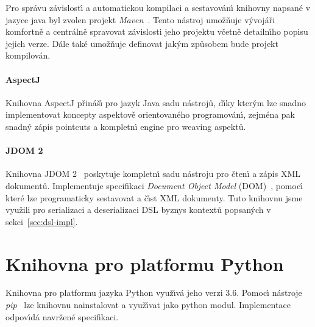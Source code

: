 Pro správu závislost\'{\i} a automatickou kompilaci a sestavován\'{\i}
knihovny napsané v jazyce java byl zvolen projekt \textit{Maven}~\cite{maven}.
Tento nástroj umožňuje v\'yvojáři komfortně a centrálně
spravovat závislosti jeho projektu včetně detailn\'{\i}ho
popisu jejich verze. Dále také umožňuje definovat jak\'ym
způsobem bude projekt kompilován.

\paragraph{AspectJ}

Knihovna AspectJ přináš\'{\i} pro jazyk Java sadu nástrojů,
d\'{\i}ky kter\'ym lze snadno implementovat koncepty aspektově orientovaného
programován\'{\i}, zejména pak snadn\'y zápis pointcuts a kompletn\'{\i}
engine pro weaving aspektů.


\paragraph{JDOM 2}

Knihovna JDOM 2~\cite{jdom2} poskytuje
kompletn\'{\i} sadu nástroju pro čten\'{\i} a zápis \gls{XML} dokumentů.
Implementuje specifikaci \textit{Document Object Model} (\gls{DOM})~\cite{wood2004document},
pomoc\'{\i} které lze programaticky sestavovat a č\'{\i}st \gls{XML} dokumenty.
Tuto knihovnu jsme využili pro serializaci a deserializaci
\gls{DSL} byznys kontextů popsan\'ych v sekci~\ref{sec:dsl-impl}.

\section{Knihovna pro platformu Python}

Knihovna pro platformu jazyka Python využ\'{\i}vá jeho
verzi 3.6. Pomoc\'{\i} nástroje \textit{pip}~\cite{pip}
lze knihovnu nainstalovat a využ\'{\i}vat jako python modul.
Implementace odpov\'{\i}dá navržené specifikaci.


